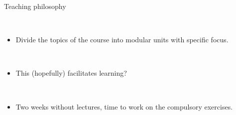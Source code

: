 \documentclass[10pt,ignorenonframetext,]{beamer}
\providecommand{\tightlist}{%
  \setlength{\itemsep}{0pt}\setlength{\parskip}{0pt}}
\begin{document}
\begin{frame}

\begin{block}{Teaching philosophy}

~

\begin{itemize}
\tightlist
\item
  Divide the topics of the course into modular units with specific
  focus.
\end{itemize}

~

\begin{itemize}
\tightlist
\item
  This (hopefully) facilitates learning?
\end{itemize}

~

\begin{itemize}
\tightlist
\item
  Two weeks without lectures, time to work on the compulsory exercises.
\end{itemize}

\end{block}

\end{frame}
\end{document}

